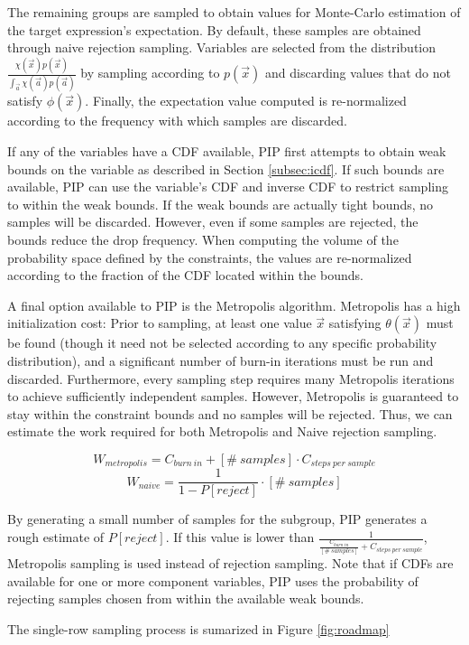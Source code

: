 The remaining groups are sampled to obtain values for Monte-Carlo estimation of the target expression's expectation.  By default, these samples are obtained through naive rejection sampling.  Variables are selected from the distribution $\frac{\chi(\vec{x})p(\vec{x})}{\int_{\vec{a}} \chi(\vec{a})p(\vec{a})}$ by sampling according to $p(\vec{x})$ and discarding values that do not satisfy $\phi(\vec{x})$.  Finally, the expectation value computed is re-normalized according to the frequency with which samples are discarded.

If any of the variables have a CDF available, PIP first attempts to obtain weak bounds on the variable as described in Section \ref{subsec:icdf}.  If such bounds are available, PIP can use the variable's CDF and inverse CDF to restrict sampling to within the weak bounds.  If the weak bounds are actually tight bounds, no samples will be discarded.  However, even if some samples are rejected, the bounds reduce the drop frequency.  When computing the volume of the probability space defined by the constraints, the values are re-normalized according to the fraction of the CDF located within the bounds.

A final option available to PIP is the Metropolis algorithm.  Metropolis has a high initialization cost: Prior to sampling, at least one value $\vec x$ satisfying $\theta(\vec x)$ must be found (though it need not be selected according to any specific probability distribution), and a significant number of burn-in iterations must be run and discarded.  Furthermore, every sampling step requires many Metropolis iterations to achieve sufficiently independent samples.  However, Metropolis is guaranteed to stay within the constraint bounds and no samples will be rejected.  Thus, we can estimate the work required for both Metropolis and Naive rejection sampling.

$$W_{metropolis} = C_{burn\ in} + [\#\ samples] \cdot C_{steps\ per\ sample}$$
$$W_{naive} = \frac{1}{1-P[reject]} \cdot [\#\ samples]$$

By generating a small number of samples for the subgroup, PIP generates a rough estimate of $P[reject]$.  If this value is lower than $\frac{1}{\frac{C_{burn\ in}}{[\#\ samples]} + C_{steps\ per\ sample}}$, Metropolis sampling is used instead of rejection sampling.  Note that if CDFs are available for one or more component variables, PIP uses the probability of rejecting samples chosen from within the available weak bounds.

The single-row sampling process is sumarized in Figure \ref{fig:roadmap}

